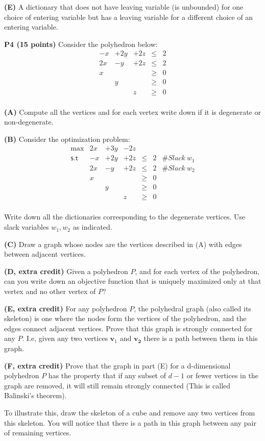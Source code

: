 \documentclass[11pt]{article}
\begin{document}
\medskip

\noindent\textbf{(E)} A dictionary that does not have leaving variable
(is unbounded) for one choice of entering variable but has a leaving
variable for a different choice of an entering variable.

\bigskip

\noindent\textbf{P4 (15 points)}  Consider the polyhedron below:
\[ \begin{array}{ccccc}
 -x & + 2 y & + 2z & \leq & 2 \\
2 x & - y & + 2z & \leq & 2 \\
x & & & \geq & 0\\
& y& & \geq & 0 \\
& & z & \geq & 0 \\
\end{array}\]

\noindent\textbf{(A)} Compute all the vertices and for each vertex
write down if it is degenerate or non-degenerate.

\noindent\textbf{(B)} Consider the optimization problem:
\[ \begin{array}{rcccccc}
\max & 2x & + 3y & - 2z \\
\mathsf{s.t} &  -x & + 2 y & + 2z & \leq & 2 & \# Slack\ w_1\\
& 2 x & - y & + 2z & \leq & 2 & \# Slack\ w_2\\
& x & & & \geq & 0\\
& & y& & \geq & 0 \\
& & & z & \geq & 0 \\
\end{array}\]

Write down all the dictionaries corresponding to the degenerate
vertices. Use slack variables $w_1, w_2$ as indicated.

\noindent\textbf{(C)} Draw a graph whose nodes are the vertices
described in (A) with edges between adjacent vertices. 

\medskip

\noindent\textbf{(D, extra credit)} Given a polyhedron $P$, and for
each vertex of the polyhedron,  can you  write down an
objective function that is uniquely maximized only at that vertex and
no other vertex of $P$? 


\medskip

\noindent\textbf{(E, extra credit)} For any polyhedron $P$, the
polyhedral graph (also called its skeleton) is one where the nodes
form the vertices of the polyhedron, and the edges connect adjacent
vertices. Prove that this graph is strongly connected for any
$P$. I.e, given any two vertices $\mathbf{v}_1$ and $\mathbf{v_2}$
there is a path between them in this graph.

\medskip

\noindent\textbf{(F, extra credit)}  Prove that the graph in part (E)
for a d-dimensional polyhedron $P$ has the property that if any subset
of $d-1$ or fewer vertices in the graph are removed, it will still
remain strongly connected (This is called Balinski's theorem).

To illustrate this, draw the skeleton of a cube and remove any two
vertices from this skeleton. You will notice that there is a path in
this graph between any pair of remaining vertices.
\end{document}

